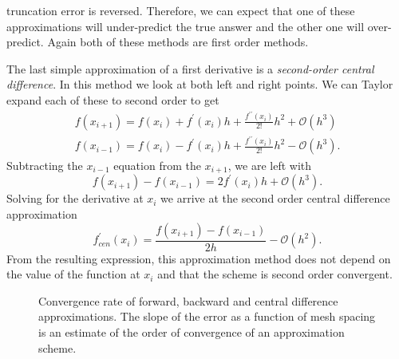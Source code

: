 truncation error is reversed. Therefore, we can expect that one of these approximations will under-predict the true answer
and the other one will over-predict. Again both of these methods are first order methods.
\par 
The last simple approximation of a first derivative is a \emph{second-order central difference}. In this method we look 
at both left and right points. We can Taylor expand each of these to second order to get
\begin{eqnarray}
    f\left(x_{i+1}\right) = f\left(x_{i}\right) + f^{\prime}\left(x_{i}\right)h + \frac{f^{\prime\prime}\left(x_{i}\right)}{2!}h^{2} + \mathcal{O}\left(h^{3}\right) \\
    f\left(x_{i-1}\right) = f\left(x_{i}\right) - f^{\prime}\left(x_{i}\right)h + \frac{f^{\prime\prime}\left(x_{i}\right)}{2!}h^{2} - \mathcal{O}\left(h^{3}\right).
\end{eqnarray}
Subtracting the $x_{i-1}$ equation from the $x_{i+1}$, we are left with
\begin{equation}
    f\left(x_{i+1}\right) - f\left(x_{i-1}\right) = 2f^{\prime}\left(x_{i}\right)h  + \mathcal{O}\left(h^{3}\right).
\end{equation}
Solving for the derivative at $x_{i}$ we arrive at the second order central difference approximation
\begin{equation}
    \boxed{f^{\prime}_{cen}\left(x_{i}\right) = \frac{f\left(x_{i+1}\right) - f\left(x_{i-1}\right)}{2h} - \mathcal{O}\left(h^{2}\right)}.
\end{equation}
From the resulting expression, this approximation method does not depend on the value of the function at $x_{i}$ and that
the scheme is second order convergent.
\par
\begin{figure}[t]
\sidecaption[t]
\scalebox{0.5}{}
\caption{Convergence rate of forward, backward and central difference approximations. The slope of the error as a function of mesh spacing
is an estimate of the order of convergence of an approximation scheme.}
\label{fig:fdm_convergence}       %
\end{figure}
